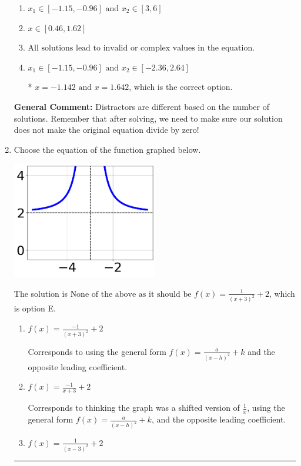 \documentclass{extbook}[14pt]
\newcommand{\litem}[1]{\item #1

\rule{\textwidth}{0.4pt}}
\begin{document}
\begin{enumerate}
{\begin{enumerate}[label=\Alph*.]
\item \( x_1 \in [-1.15, -0.96] \text{ and } x_2 \in [3,6] \)


\item \( x \in [0.46,1.62] \)


\item \( \text{All solutions lead to invalid or complex values in the equation.} \)


\item \( x_1 \in [-1.15, -0.96] \text{ and } x_2 \in [-2.36,2.64] \)

* $x = -1.142 \text{ and } x = 1.642$, which is the correct option.
\end{enumerate}

\textbf{General Comment:} Distractors are different based on the number of solutions. Remember that after solving, we need to make sure our solution does not make the original equation divide by zero!
}
\litem{
Choose the equation of the function graphed below.

\begin{center}
    \includegraphics[width=0.5\textwidth]{../Figures/rationalGraphToEquationA.png}
\end{center}


The solution is \( \text{None of the above as it should be } f(x) = \frac{1}{(x + 3)^2} + 2 \), which is option E.\begin{enumerate}[label=\Alph*.]
\item \( f(x) = \frac{-1}{(x + 3)^2} + 2 \)

Corresponds to using the general form $f(x) = \frac{a}{(x-h)^2}+k$ and the opposite leading coefficient.
\item \( f(x) = \frac{-1}{x + 3} + 2 \)

Corresponds to thinking the graph was a shifted version of $\frac{1}{x}$, using the general form $f(x) = \frac{a}{(x-h)^2}+k$, and the opposite leading coefficient.
\item \( f(x) = \frac{1}{(x - 3)^2} + 2 \)


\end{enumerate}}
\end{enumerate}
\end{document}
